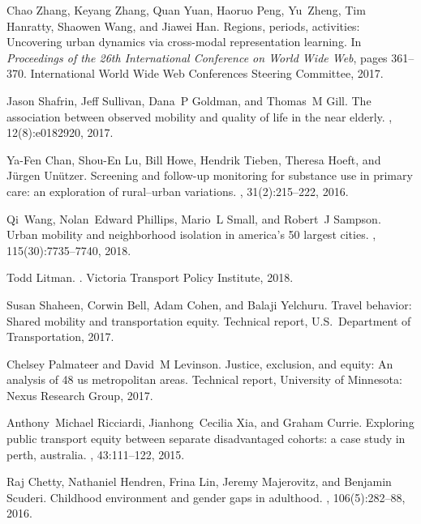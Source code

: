 
Chao Zhang, Keyang Zhang, Quan Yuan, Haoruo Peng, Yu~Zheng, Tim Hanratty,
  Shaowen Wang, and Jiawei Han.
\newblock Regions, periods, activities: Uncovering urban dynamics via
  cross-modal representation learning.
\newblock In {\em Proceedings of the 26th International Conference on World
  Wide Web}, pages 361--370. International World Wide Web Conferences Steering
  Committee, 2017.

Jason Shafrin, Jeff Sullivan, Dana~P Goldman, and Thomas~M Gill.
\newblock The association between observed mobility and quality of life in the
  near elderly.
, 12(8):e0182920, 2017.

Ya-Fen Chan, Shou-En Lu, Bill Howe, Hendrik Tieben, Theresa Hoeft, and
  J{\"u}rgen Un{\"u}tzer.
\newblock Screening and follow-up monitoring for substance use in primary care:
  an exploration of rural--urban variations.
, 31(2):215--222, 2016.

Qi~Wang, Nolan~Edward Phillips, Mario~L Small, and Robert~J Sampson.
\newblock Urban mobility and neighborhood isolation in america’s 50 largest
  cities.
,
  115(30):7735--7740, 2018.

Todd Litman.
.
\newblock Victoria Transport Policy Institute, 2018.

Susan Shaheen, Corwin Bell, Adam Cohen, and Balaji Yelchuru.
\newblock Travel behavior: Shared mobility and transportation equity.
\newblock Technical report, U.S.\ Department of Transportation, 2017.

Chelsey Palmateer and David~M Levinson.
\newblock Justice, exclusion, and equity: An analysis of 48 us metropolitan
  areas.
\newblock Technical report, University of Minnesota: Nexus Research Group,
  2017.

Anthony~Michael Ricciardi, Jianhong~Cecilia Xia, and Graham Currie.
\newblock Exploring public transport equity between separate disadvantaged
  cohorts: a case study in perth, australia.
, 43:111--122, 2015.

Raj Chetty, Nathaniel Hendren, Frina Lin, Jeremy Majerovitz, and Benjamin
  Scuderi.
\newblock Childhood environment and gender gaps in adulthood.
, 106(5):282--88, 2016.

